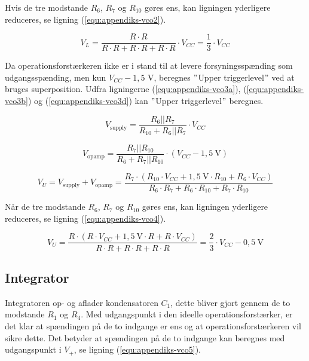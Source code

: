 Hvis de tre modstande $R_6$, $R_7$ og $R_{10}$ gøres ens, kan ligningen yderligere reduceres, se ligning (\ref{equ:appendiks-vco2}).

\begin{equation}
\label{equ:appendiks-vco2}
V_L = \frac{R \cdot R}{R \cdot R + R \cdot R + R \cdot R} \cdot V_{CC} = \frac{1}{3} \cdot V_{CC}
\end{equation}

Da operationsforstærkeren ikke er i stand til at levere forsyningsspænding som udgangsspænding, men kun $V_{CC} - 1,5$ V, beregnes $"$Upper triggerlevel$"$ ved at bruges superposition. Udfra ligningerne (\ref{equ:appendiks-vco3a}), (\ref{equ:appendiks-vco3b}) og (\ref{equ:appendiks-vco3d}) kan $"$Upper triggerlevel$"$ beregnes.

\begin{equation}
\label{equ:appendiks-vco3a}
V_{\mathrm{supply}} = \frac{R_6||R_7}{R_{10} + R_6||R_7} \cdot V_{CC}
\end{equation}

\begin{equation}
\label{equ:appendiks-vco3b}
V_{\mathrm{opamp}} = \frac{R_7||R_{10}}{R_6 + R_7||R_{10}} \cdot (V_{CC} - 1,5~\mathrm{V})
\end{equation}

\begin{equation}
\label{equ:appendiks-vco3d}
V_U = V_{\mathrm{supply}} + V_{\mathrm{opamp}} = \frac{R_7 \cdot (R_{10} \cdot V_{CC} + 1,5~\mathrm{V} \cdot R_{10} + R_6 \cdot V_{CC})}{R_6 \cdot R_7 + R_6 \cdot R_{10} + R_7 \cdot R_{10}}
\end{equation}

Når de tre modstande $R_6$, $R_7$ og $R_{10}$ gøres ens, kan ligningen yderligere reduceres, se ligning (\ref{equ:appendiks-vco4}).

\begin{equation}
\label{equ:appendiks-vco4}
V_U = \frac{R \cdot (R \cdot V_{CC} + 1,5~\mathrm{V} \cdot R + R \cdot V_{CC})}{R \cdot R + R \cdot R + R \cdot R} = \frac{2}{3} \cdot V_{CC} - 0,5~\mathrm{V}
\end{equation}

\subsection*{Integrator}
Integratoren op- og aflader kondensatoren $C_1$, dette bliver gjort gennem de to modstande $R_1$ og $R_4$. Med udgangspunkt i den ideelle operationsforstærker, er det klar at spændingen på de to indgange er ens og at operationsforstærkeren vil sikre dette. Det betyder at spændingen på de to indgange kan beregnes med udgangspunkt i $V_+$, se ligning (\ref{equ:appendiks-vco5}).

